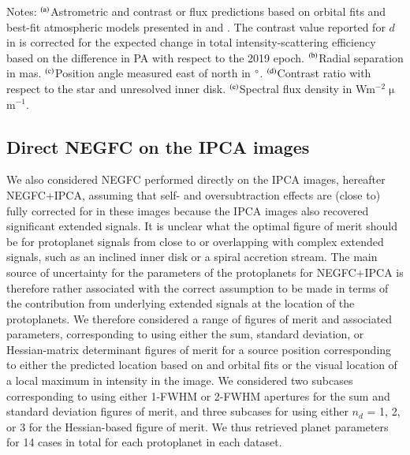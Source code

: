 \documentclass[longauth]{aa}
\begin{document}
\begin{appendix}
\begin{table}
\begin{center}
\begin{tabular}{lcccc}
\hline
\end{tabular}
\end{center}
Notes: $^{\rm (a)}$Astrometric and contrast or flux predictions based on orbital fits and best-fit atmospheric models presented in \citet{Wang2021} and . The contrast value reported for $d$ in  is corrected for the expected change in total intensity-scattering efficiency based on the difference in PA with respect to the 2019 epoch. $^{\rm (b)}$Radial separation in mas. $^{\rm (c)}$Position angle measured east of north in $^\circ$. $^{\rm (d)}$Contrast ratio with respect to the star and unresolved inner disk.
$^{\rm (e)}$Spectral flux density in Wm$^{-2} \upmu$m$^{-1}$. %
\end{table}


\subsection{Direct NEGFC on the IPCA images} 

We also considered NEGFC performed directly on the IPCA images, hereafter NEGFC+IPCA, assuming that self- and oversubtraction effects are (close to) fully corrected for in these images because the IPCA images also recovered significant extended signals. It is unclear what the optimal figure of merit should be for protoplanet signals from close to or overlapping with complex extended signals, such as an inclined inner disk or a spiral accretion stream. The main source of uncertainty for the parameters of the protoplanets for NEGFC+IPCA is therefore rather associated with the correct assumption to be made in terms of the contribution from underlying extended signals at the location of the protoplanets. We therefore considered a range of figures of merit and associated parameters,
corresponding to using either the sum, standard deviation, or Hessian-matrix determinant figures of merit for a source position corresponding to either the predicted location based on \citet{Wang2021} and  orbital fits or the visual location of a local maximum in intensity in the image. We considered two subcases corresponding to using either 1-FWHM or 2-FWHM apertures for the sum and standard deviation figures of merit, and three subcases for using either $n_d$ = 1, 2, or 3 %
for the Hessian-based figure of merit.
We thus retrieved planet parameters for 14 cases in total for each protoplanet in each dataset.


\end{appendix}
\end{document}
